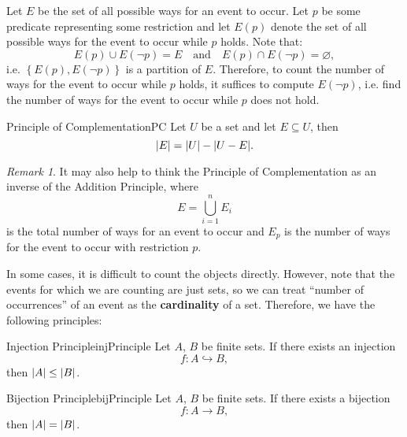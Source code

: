 \documentclass[math]{amznotes}
\theoremstyle{remark}
\newtheorem*{remark}{Remark}
\begin{document}
Let $E$ be the set of all possible ways for an event to occur. Let $p$ be some predicate representing some restriction and let $E(p)$ denote the set of all possible ways for the event to occur while $p$ holds. Note that:
\begin{displaymath}
    E(p) \cup E(\neg p) = E \quad \textrm{and} \quad E(p) \cap E(\neg p) = \varnothing,
\end{displaymath}
i.e. $\left\{E(p), E(\neg p)\right\}$ is a partition of $E$. Therefore, to count the number of ways for the event to occur while $p$ holds, it suffices to compute $E(\neg p)$, i.e. find the number of ways for the event to occur while $p$ does not hold.
\begin{thmbox}{Principle of Complementation}{PC}
    Let $U$ be a set and let $E \subseteq U$, then 
    \begin{equation*}
        {\left\lvert {E} \right\rvert} = {\left\lvert {U} \right\rvert} - {\left\lvert {U - E} \right\rvert}.
    \end{equation*}
\end{thmbox}
\begin{notebox}
    \begin{remark}
        It may also help to think the Principle of Complementation as an inverse of the Addition Principle, where
        \begin{displaymath}
            E = \bigcup_{i = 1}^n E_i
        \end{displaymath}
        is the total number of ways for an event to occur and $E_p$ is the number of ways for the event to occur with restriction $p$.
    \end{remark}
\end{notebox}
In some cases, it is difficult to count the objects directly. However, note that the events for which we are counting are just sets, so we can treat ``number of occurrences'' of an event as the \textbf{cardinality} of a set. Therefore, we have the following principles:
\begin{thmbox}{Injection Principle}{injPrinciple}
    Let $A$, $B$ be finite sets. If there exists an injection
    \begin{displaymath}
        f \colon A \hookrightarrow B,
    \end{displaymath}
    then ${\left\lvert {A} \right\rvert} \leq {\left\lvert {B} \right\rvert}$.
\end{thmbox}
\begin{thmbox}{Bijection Principle}{bijPrinciple}
    Let $A$, $B$ be finite sets. If there exists a bijection
    \begin{displaymath}
        f \colon A \to B,
    \end{displaymath}
    then ${\left\lvert {A} \right\rvert} = {\left\lvert {B} \right\rvert}$.
\end{thmbox}
\end{document}
